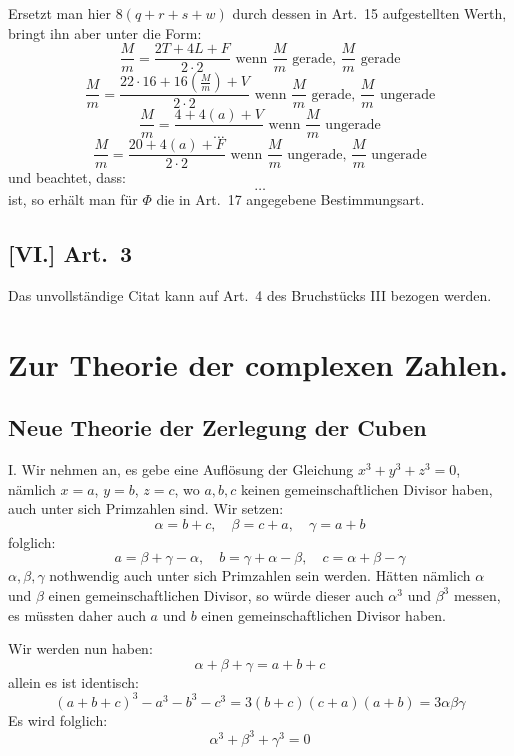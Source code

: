 \documentclass[12pt,a4paper]{article}
\begin{document}
Ersetzt man hier $8(q + r + s + w)$ durch dessen in Art.~15 aufgestellten Werth, bringt ihn aber unter die Form:
\[
\frac{M}{m} = \frac{2T + 4L + F}{2 \cdot 2} \text{ wenn } \frac{M}{m} \text{ gerade, } \frac{M}{m} \text{ gerade}
\]
\[
\frac{M}{m} = \frac{22 \cdot 16 + 16(\frac{M}{m}) + V}{2 \cdot 2} \text{ wenn } \frac{M}{m} \text{ gerade, } \frac{M}{m} \text{ ungerade}
\]
\[
\frac{M}{m} = \frac{4 + 4(a) + V}{\ldots} \text{ wenn } \frac{M}{m} \text{ ungerade}
\]
\[
\frac{M}{m} = \frac{20 + 4(a) + F}{2 \cdot 2} \text{ wenn } \frac{M}{m} \text{ ungerade, } \frac{M}{m} \text{ ungerade}
\]
und beachtet, dass:
\[
\ldots
\]
ist, so erhält man für $\Phi$ die in Art.~17 angegebene Bestimmungsart.

\subsection*{[VI.] Art.~3}

Das unvollständige Citat kann auf Art.~4 des Bruchstücks III bezogen werden.


\section*{Zur Theorie der complexen Zahlen.}

\subsection*{Neue Theorie der Zerlegung der Cuben}

I. Wir nehmen an, es gebe eine Auflösung der Gleichung $x^3 + y^3 + z^3 = 0$, nämlich $x = a$, $y = b$, $z = c$, wo $a, b, c$ keinen gemeinschaftlichen Divisor haben, auch unter sich Primzahlen sind. Wir setzen:
\[
\alpha = b + c, \quad \beta = c + a, \quad \gamma = a + b
\]
folglich:
\[
a = \beta + \gamma - \alpha, \quad b = \gamma + \alpha - \beta, \quad c = \alpha + \beta - \gamma
\]
$\alpha, \beta, \gamma$ nothwendig auch unter sich Primzahlen sein werden. Hätten nämlich $\alpha$ und $\beta$ einen gemeinschaftlichen Divisor, so würde dieser auch $\alpha^3$ und $\beta^3$ messen, es müssten daher auch $a$ und $b$ einen gemeinschaftlichen Divisor haben.

Wir werden nun haben:
\[
\alpha + \beta + \gamma = a + b + c
\]
allein es ist identisch:
\[
(a + b + c)^3 - a^3 - b^3 - c^3 = 3(b + c)(c + a)(a + b) = 3\alpha\beta\gamma
\]
Es wird folglich:
\[
\alpha^3 + \beta^3 + \gamma^3 = 0
\]
\end{document}
